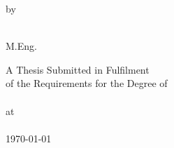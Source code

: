 \pagestyle{empty}
\newpage
\addtocounter{page}{-1}
\begin{center}
\vspace*{2cm}
\huge{ \bf \ttitle}
\end{center}

\vspace{20mm}
\begin{center}
by

\vspace{10mm}
{\bf \authorname}\\
M.Eng. \textit{\msunivname}
\end{center}

\vspace{30mm}
\begin{center}
A Thesis Submitted in Fulfilment \\
of the Requirements for the Degree of \\
\degreename \\
\vspace{10mm}
at \\
\vspace{10mm}
\univname\\
\monthyeardate\today
\end{center}